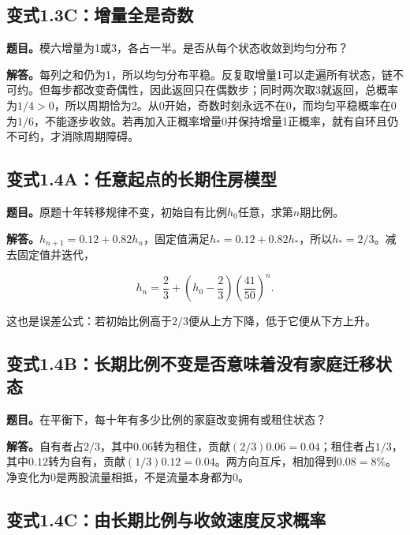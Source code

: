 \documentclass[
  11pt,a4paper,UTF8,fontset=fandol]{ctexart}
\begin{document}
\subsection{变式1.3C：增量全是奇数}\label{ux53d8ux5f0f1.3cux589eux91cfux5168ux662fux5947ux6570}

\textbf{题目。}模六增量为1或3，各占一半。是否从每个状态收敛到均匀分布？

\textbf{解答。}每列之和仍为1，所以均匀分布平稳。反复取增量1可以走遍所有状态，链不可约。但每步都改变奇偶性，因此返回只在偶数步；同时两次取3就返回，总概率为\(1/4>0\)，所以周期恰为2。从0开始，奇数时刻永远不在0，而均匀平稳概率在0为\(1/6\)，不能逐步收敛。若再加入正概率增量0并保持增量1正概率，就有自环且仍不可约，才消除周期障碍。

\subsection{变式1.4A：任意起点的长期住房模型}\label{ux53d8ux5f0f1.4aux4efbux610fux8d77ux70b9ux7684ux957fux671fux4f4fux623fux6a21ux578b}

\textbf{题目。}原题十年转移规律不变，初始自有比例\(h_0\)任意，求第\(n\)期比例。

\textbf{解答。}\(h_{n+1}=0.12+0.82h_n\)，固定值满足\(h_*=0.12+0.82h_*\)，所以\(h_*=2/3\)。减去固定值并迭代，

\[\boxed{h_n=\frac23+\left(h_0-\frac23\right)\left(\frac{41}{50}\right)^n.}\]

这也是误差公式：若初始比例高于\(2/3\)便从上方下降，低于它便从下方上升。

\subsection{变式1.4B：长期比例不变是否意味着没有家庭迁移状态}\label{ux53d8ux5f0f1.4bux957fux671fux6bd4ux4f8bux4e0dux53d8ux662fux5426ux610fux5473ux7740ux6ca1ux6709ux5bb6ux5eadux8fc1ux79fbux72b6ux6001}

\textbf{题目。}在平衡下，每十年有多少比例的家庭改变拥有或租住状态？

\textbf{解答。}自有者占\(2/3\)，其中\(0.06\)转为租住，贡献\((2/3)0.06=0.04\)；租住者占\(1/3\)，其中\(0.12\)转为自有，贡献\((1/3)0.12=0.04\)。两方向互斥，相加得到\(\boxed{0.08=8\%}\)。净变化为0是两股流量相抵，不是流量本身都为0。

\subsection{变式1.4C：由长期比例与收敛速度反求概率}\label{ux53d8ux5f0f1.4cux7531ux957fux671fux6bd4ux4f8bux4e0eux6536ux655bux901fux5ea6ux53cdux6c42ux6982ux7387}
\end{document}
